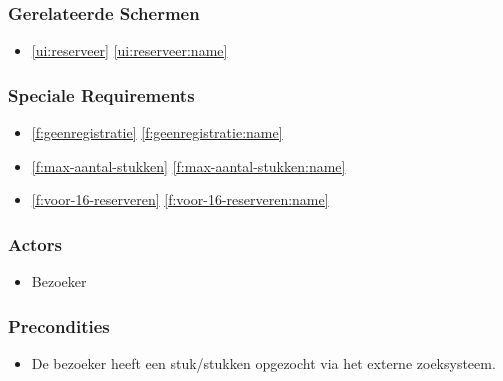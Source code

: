 \documentclass[a4paper,titlepage]{report}
\def\namedref#1{\ref{#1} \ref{#1:name}}
\begin{document}
      \subsubsection{Gerelateerde Schermen}
        \begin{itemize}
          \item \namedref{ui:reserveer}
        \end{itemize}
      \subsubsection{Speciale Requirements}
        \begin{itemize}
          \item \namedref{f:geenregistratie}
          \item \namedref{f:max-aantal-stukken}
          \item \namedref{f:voor-16-reserveren}
        \end{itemize}
      \subsubsection{Actors}
        \begin{itemize}
          \item Bezoeker
        \end{itemize}
      \subsubsection{Precondities}
        \begin{itemize}
          \item De bezoeker heeft een stuk/stukken opgezocht via het externe
            zoeksysteem.
        \end{itemize}
\end{document}

